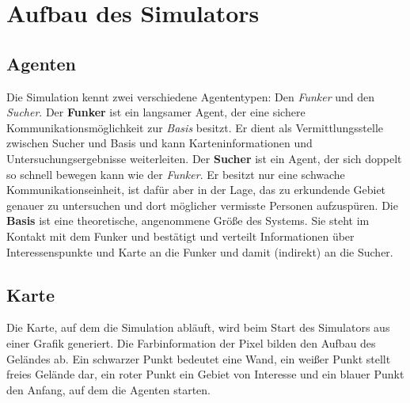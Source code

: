 \documentclass{scrartcl}
\begin{document}

\section{Aufbau des Simulators}
\subsection{Agenten}
Die Simulation kennt zwei verschiedene Agententypen: Den \emph{Funker} und den \emph{Sucher}.
Der \textbf{Funker} ist ein langsamer Agent, der eine sichere Kommunikationsmöglichkeit zur \emph{Basis} besitzt. Er dient als Vermittlungsstelle zwischen Sucher und Basis und kann Karteninformationen und Untersuchungsergebnisse weiterleiten.
Der \textbf{Sucher} ist ein Agent, der sich doppelt so schnell bewegen kann wie der \emph{Funker}. Er besitzt nur eine schwache Kommunikationseinheit, ist dafür aber in der Lage, das zu erkundende Gebiet genauer zu untersuchen und dort möglicher vermisste Personen aufzuspüren.
Die \textbf{Basis} ist eine theoretische, angenommene Größe des Systems. Sie steht im Kontakt mit dem Funker und bestätigt und verteilt Informationen über Interessenspunkte und Karte an die Funker und damit (indirekt) an die Sucher.
\subsection{Karte}
Die Karte, auf dem die Simulation abläuft, wird beim Start des Simulators aus einer Grafik generiert.
Die Farbinformation der Pixel bilden den Aufbau des Geländes ab. Ein schwarzer Punkt bedeutet eine Wand, ein weißer Punkt stellt freies Gelände dar, ein roter Punkt ein Gebiet von Interesse und ein blauer Punkt den Anfang, auf dem die Agenten starten.
\end{document}
